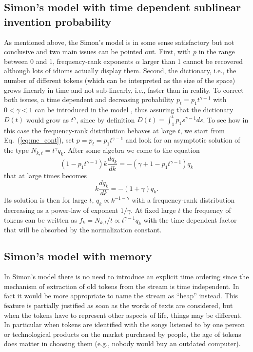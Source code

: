 \documentclass[graybox]{svmult}
\newcommand{\beq}{\begin{equation}}
\newcommand{\eeq}{\end{equation}}
\begin{document}
\subsection{Simon's model with time dependent sublinear invention probability}
As mentioned above, the Simon's model is in some sense satisfactory but not conclusive and two main issues can be pointed out.
First, with $p$ in the range between 0 and 1, frequency-rank exponents $\alpha$ larger than 1 cannot be recovered although lots of idioms actually display them.
Second, the dictionary, i.e., the number of different tokens (which can be interpreted as the size of the space) grows linearly in time and not sub-linearly, i.e., faster than in reality.
To correct both issues, a time dependent and decreasing probability $p_t=p_1 t^{\gamma-1}$ with $0<\gamma<1$ can be introduced in the model \cite{zanette2005}, thus assuring that the dictionary $D(t)$ would grow as $t^\gamma$, since by definition $D(t)=\int_1^t p_1 {s}^{\gamma-1} ds$. 
To see how in this case the frequency-rank distribution behaves at large $t$, we start from Eq.~(\ref{eq:me_cont}), set $p=p_t=p_1 t^{\gamma-1}$ and look for an asymptotic solution of the type $N_{k,t}=t^\gamma q_k$.
After some algebra we come to the equation
\beq
	(1-p_1 t^{\gamma-1}) k \frac{dq_k}{dk} = -(\gamma+1-p_1 t^{\gamma-1}) q_k
\eeq
that at large times becomes
\beq
	k \frac{dq_k}{dk}=-(1+\gamma) q_k.
\eeq
Its solution is then for large $t$, $q_k \propto k^{-1-\gamma}$ with a frequency-rank distribution decreasing as a power-law of exponent $1/\gamma$.
At fixed large $t$ the frequency of tokens can be written as $f_k=N_{k,t}/t\propto t^{\gamma-1} q_k$ with the time dependent factor that will be absorbed by the normalization constant.

\subsection{Simon's model with memory}
In Simon's model there is no need to introduce an explicit time ordering since the mechanism of extraction of old tokens from the stream is time independent. In fact it would be more appropriate to name the stream as ``heap'' instead.
This feature is partially justified as soon as the words of texts are considered, but when the tokens have to represent other aspects of life, things may be different.
In particular when tokens are identified with the songs listened to by one person or technological products on the market purchased by people, the age of tokens does matter in choosing them (e.g., nobody would buy an outdated  computer).
\end{document}
